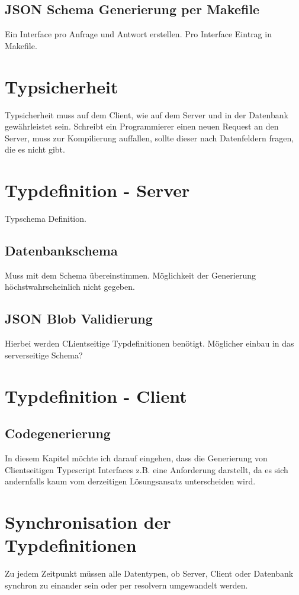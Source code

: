 \subsection{JSON Schema Generierung per Makefile}
Ein Interface pro Anfrage und Antwort erstellen. Pro Interface Eintrag in Makefile.

\section{Typsicherheit}
Typsicherheit muss auf dem Client, wie auf dem Server und in der Datenbank gewährleistet sein. Schreibt ein Programmierer einen neuen Request an den Server,
muss zur Kompilierung auffallen, sollte dieser nach Datenfeldern fragen, die es nicht gibt.

\section{Typdefinition - Server}
Typschema Definition.

\subsection{Datenbankschema}
Muss mit dem Schema übereinstimmen. Möglichkeit der Generierung höchstwahrscheinlich nicht gegeben.
\subsection{JSON Blob Validierung}
Hierbei werden CLientseitige Typdefinitionen benötigt. Möglicher einbau in das serverseitige Schema?

\section{Typdefinition - Client}
\subsection{Codegenerierung}
In diesem Kapitel möchte ich darauf eingehen, dass die Generierung von Clientseitigen Typescript Interfaces z.B. eine Anforderung darstellt, 
da es sich andernfalls kaum vom derzeitigen Lösungsansatz unterscheiden wird. 


\section{Synchronisation der Typdefinitionen}
Zu jedem Zeitpunkt müssen alle Datentypen, ob Server, Client oder Datenbank synchron zu einander sein oder per resolvern umgewandelt werden.

